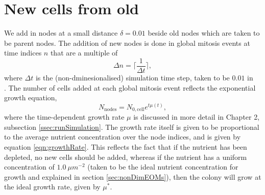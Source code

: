 \section{New cells from old}
We add in nodes at a small distance $\delta = 0.01$ beside old nodes 
which are taken to be parent nodes. The addition of new nodes is done in global mitosis events 
at time indices $n$ that are a multiple of
\begin{equation*}
    \Delta n = \bigg\lceil \frac{1}{\Delta t} \bigg\rceil,
\end{equation*}
where $\Delta t$ is the (non-dminesionalised) simulation time step, taken to be $0.01$ in \\
 .
The number of cells added at each global mitosis event reflects the exponential growth equation,
\begin{equation*}
    N_{\textrm{nodes}} = N_{0, \textrm{cell}} e^{t \mu(t)},
\end{equation*}
where the time-dependent growth rate $\mu$ is discussed 
in more detail in Chapter 2, subsection \ref{ssec:runSimulation}. The growth rate 
itself is given to be proportional to the average nutrient concentration over the node indices, and 
is given by equation \ref{eqn:growthRate}. This reflects the fact that if the nutrient has been depleted,
no new cells should be added, whereas if the nutrient has a uniform concentration of $1.0 \ \mu m^{-2}$ 
(taken to be the ideal nutrient concentration for growth and explained in section \ref{sec:nonDimEOMs}), 
then the colony will grow at the ideal growth rate, given by $\mu^*$.
\\

